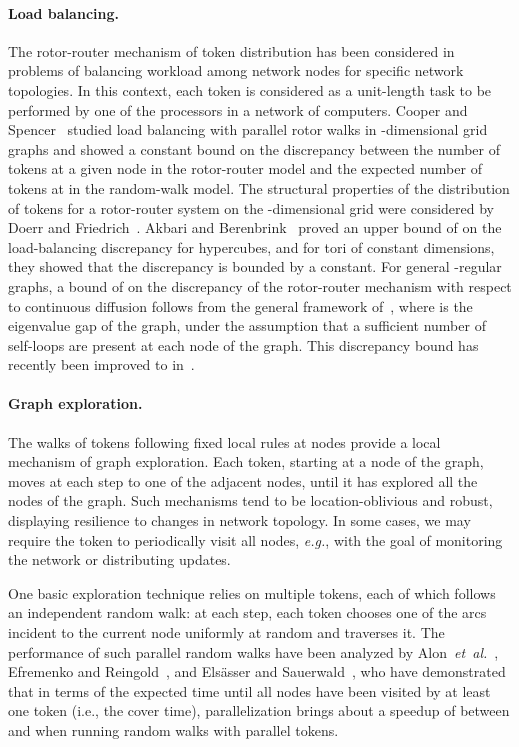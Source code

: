\documentclass{article}[11pt,letter]
\newcommand{\eg}{{\it e.g.}\xspace}
\newcommand{\etal}{{\it et~al.}}
\begin{document}
\paragraph{Load balancing.}
The rotor-router mechanism of token distribution has been considered in problems of balancing workload among network nodes for specific network topologies. In this context, each token is considered as a unit-length task to be performed by one of the processors in a network of computers. Cooper and Spencer~\cite{DBLP:journals/cpc/CooperS06} studied load balancing with parallel rotor walks in -dimensional grid graphs and showed a constant bound on the discrepancy between the number of tokens at a given node  in the rotor-router model and the expected number of tokens at  in the random-walk model. The structural properties of the distribution of tokens for a rotor-router system on the -dimensional grid were considered by Doerr and Friedrich~\cite{DBLP:journals/cpc/DoerrF09}. Akbari and Berenbrink~\cite{DBLP:conf/spaa/AkbariB13} proved an upper bound of  on the load-balancing discrepancy for hypercubes, and for tori of constant dimensions, they showed that the discrepancy is bounded by a constant. For general -regular graphs, a bound of  on the discrepancy of the rotor-router mechanism with respect to continuous diffusion follows from the general framework of~\cite{RSW98}, where  is the eigenvalue gap of the graph, under the assumption that a sufficient number of self-loops are present at each node of the graph. This discrepancy bound has recently been improved to  in~\cite{DBLP:journals/corr/BerenbrinkKKMU14}.

\paragraph{Graph exploration.}
The walks of tokens following fixed local rules at nodes provide a local mechanism of graph exploration. Each token, starting at a node of the graph, moves at each step to one of the adjacent nodes, until it has explored all the nodes of the graph. Such mechanisms tend to be location-oblivious and robust, displaying resilience to changes in network topology. In some cases, we may require the token to periodically visit all nodes, \eg, with the goal of monitoring the network or distributing updates.

One basic exploration technique relies on multiple tokens, each of which follows an independent random walk: at each step, each token chooses one of the arcs incident to the current node uniformly at random and traverses it. The performance of such parallel random walks have been analyzed by Alon~\etal~\cite{A08}, Efremenko and Reingold~\cite{DBLP:conf/approx/EfremenkoR09}, and Els\"asser and Sauerwald~\cite{DBLP:journals/tcs/ElsasserS11}, who have demonstrated that in terms of the expected time until all nodes have been visited by at least one token (i.e., the cover time), parallelization brings about a speedup of between  and  when running random walks with  parallel tokens.
\end{document}
